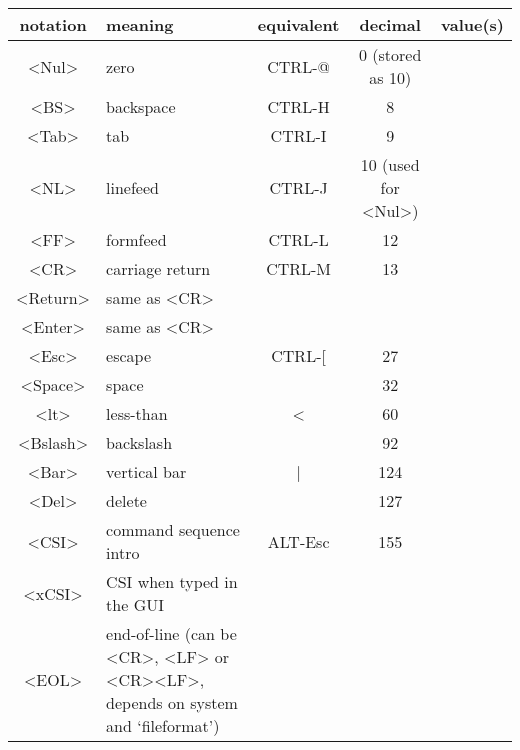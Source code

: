 \begin{description}
\begin{tabularx}{\textwidth}{|c|X|c|c|c|}
				\hline
				notation & meaning                   & equivalent & decimal             & value(s)\\ \hline
				<Nul>    & zero                      & CTRL-@     & 0 (stored as 10)    & \label{<Nul>}\\
				<BS>     & backspace                 & CTRL-H     & 8                   & \label{backspace}\\
				<Tab>    & tab                       & CTRL-I     & 9                   & \label{tab} \label{Tab}\\
				<NL>     & linefeed                  & CTRL-J     & 10 (used for <Nul>) & \label{linefeed}\\
				<FF>     & formfeed                  & CTRL-L     & 12                  & \label{formfeed}\\
				<CR>     & carriage return           & CTRL-M     & 13                  & \label{carriage-return}\\
				<Return> & same as <CR>              &            &                     & \label{<Return>}\\
				<Enter>  & same as <CR>              &            &                     & \label{<Enter>}\\
				<Esc>    & escape                    & CTRL-[     & 27                  & \label{escape} \label{<Esc>}\\
				<Space>  & space                     &            & 32                  & \label{space}\\
				<lt>     & less-than                 & <          & 60                  & \label{<lt>}\\
				<Bslash> & backslash                 & \          & 92                  & \label{backslash} \label{<Bslash>}\\
				<Bar>    & vertical bar              & |          & 124                 & \label{<Bar>}\\
				<Del>    & delete                    &            & 127\\
				<CSI>    & command sequence intro    & ALT-Esc    & 155                 & \label{<CSI>}\\
				<xCSI>   & CSI when typed in the GUI &            &                     & \label{<xCSI>}\\

				<EOL> & end-of-line (can be <CR>, <LF> or <CR><LF>, depends on system and `fileformat') & & & \label{<EOL>}\\ %


\end{tabularx}
\end{description}
